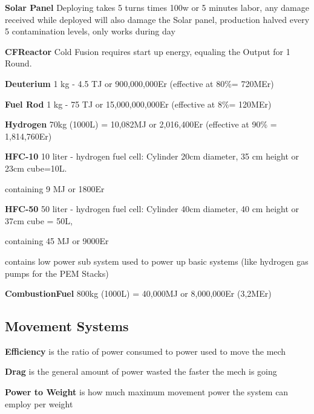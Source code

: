 \textbf {Solar Panel} Deploying takes 5 turns times 100w or 5 minutes labor, any damage received while deployed
will also damage the Solar panel, production halved every 5 contamination levels, only works during day

\textbf {CFReactor} Cold Fusion requires start up energy, equaling the Output for 1 Round.

\textbf {Deuterium} 1 kg - 4.5 TJ or 900,000,000Er (effective at 80\%= 720MEr)

\textbf {Fuel Rod} 1 kg - 75 TJ or 15,000,000,000Er (effective at 8\%= 120MEr)

\textbf {Hydrogen} 70kg (1000L) = 10,082MJ or 2,016,400Er (effective at 90\% = 1,814,760Er)

\textbf {HFC-10} 10 liter - hydrogen fuel cell: Cylinder 20cm diameter,
35 cm height or 23cm cube=10L. \par
containing 9 MJ or 1800Er

\textbf {HFC-50} 50 liter - hydrogen fuel cell: Cylinder 40cm diameter,
40 cm height or 37cm cube = 50L,
\par containing 45 MJ or 9000Er\par
contains low power sub system used to power up basic systems (like hydrogen gas pumps for the PEM Stacks)

\textbf{CombustionFuel} 800kg (1000L) = 40,000MJ or 8,000,000Er (3,2MEr)

\subsection{Movement Systems}\label{subsec:movementsystems}

\textbf{Efficiency} is the ratio of power consumed to power used to move the mech

\textbf{Drag} is the general amount of power wasted the faster the mech is going

\textbf{Power to Weight} is how much maximum movement power the system can employ per weight

